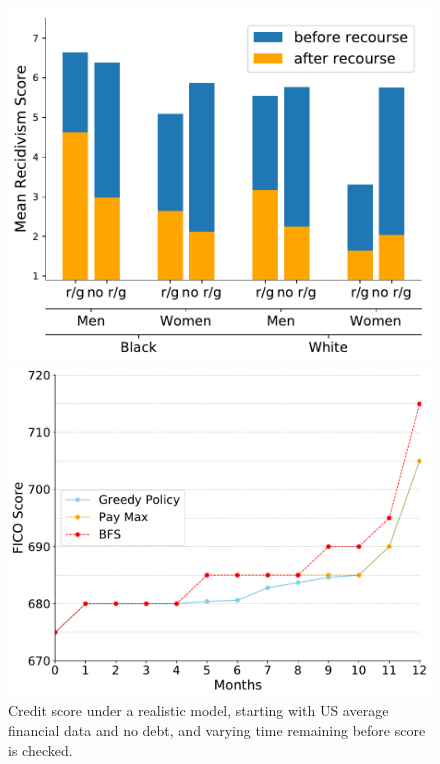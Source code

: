 \begin{figure}
\includegraphics[width=\linewidth]{figures/compas_subgroup-new.pdf}
\caption{Mean recidivism risk score 
before and after following MCTS-generated incentives for 6 to 10 steps, varying the inclusion of race/gender in decisions.}
    \label{fig:fairrecourse}
\endminipage\hfill
{}
\includegraphics[width=\linewidth]{figures/averageamerican.pdf}
\caption{Credit score under a realistic model, starting with US average financial data and no debt, and varying time remaining before score is checked.}

\end{figure}
